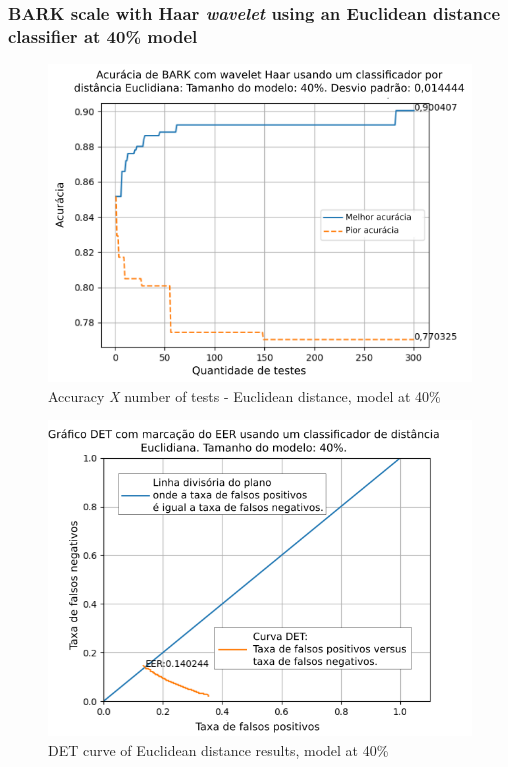 		\subsubsection{BARK scale with Haar \textit{wavelet} using an Euclidean distance classifier at 40\% model}
		
			
			
			\begin{figure}[ht]
				\centering
				\includegraphics[width=\linewidth]{images/results/confusionMatrices/classifier_Euclidian_40}
				\caption{Accuracy \textit{X} number of tests - Euclidean distance, model at 40\%}
				\label{fig:classifiereuclidian40}
			\end{figure}
			
			\begin{figure}[!ht]
				\centering
				\includegraphics[width=\linewidth]{images/results/det/DET_for_classifier_Euclidian_40}
				\caption{DET curve of Euclidean distance results, model at 40\%}
				\label{fig:detforclassifiereuclidian40}
			\end{figure}
		
